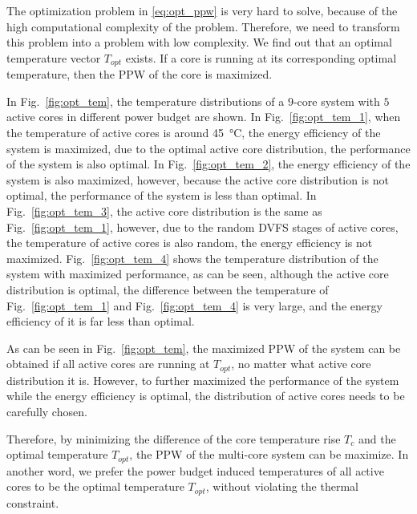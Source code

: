 The optimization problem in \eqref{eq:opt_ppw} is very hard to solve, because of the high computational complexity of the problem. Therefore, we need to transform this problem into a problem with low complexity. We find out that an optimal temperature vector $T_{opt}$ exists. If a core is running at its corresponding optimal temperature, then the PPW of the core is maximized.

In Fig.~\ref{fig:opt_tem}, the temperature distributions of a $9$-core system with $5$ active cores in different power budget are shown. In Fig.~\ref{fig:opt_tem_1}, when the temperature of active cores is around \SI{45}{\degreeCelsius}, the energy efficiency of the system is maximized, due to the optimal active core distribution, the performance of the system is also optimal. In Fig.~\ref{fig:opt_tem_2}, the energy efficiency of the system is also maximized, however, because the active core distribution is not optimal, the performance of the system is less than optimal. In Fig.~\ref{fig:opt_tem_3}, the active core distribution is the same as Fig.~\ref{fig:opt_tem_1}, however, due to the random DVFS stages of active cores, the temperature of active cores is also random, the energy efficiency is not maximized. Fig.~\ref{fig:opt_tem_4} shows the temperature distribution of the system with maximized performance, as can be seen, although the active core distribution is optimal, the difference between the temperature of Fig.~\ref{fig:opt_tem_1} and Fig.~\ref{fig:opt_tem_4} is very large, and the energy efficiency of it is far less than optimal.

As can be seen in Fig.~\ref{fig:opt_tem}, the maximized PPW of the system can be obtained if all active cores are running at $T_{opt}$, no matter what active core distribution it is. However, to further maximized the performance of the system while the energy efficiency is optimal, the distribution of active cores needs to be carefully chosen.

Therefore, by minimizing the difference of the core temperature rise $T_{c}$ and the optimal temperature $T_{opt}$, the PPW of the multi-core system can be maximize. In another word, we prefer the power budget induced temperatures of all active cores to be the optimal temperature $T_{opt}$, without violating the thermal constraint.


